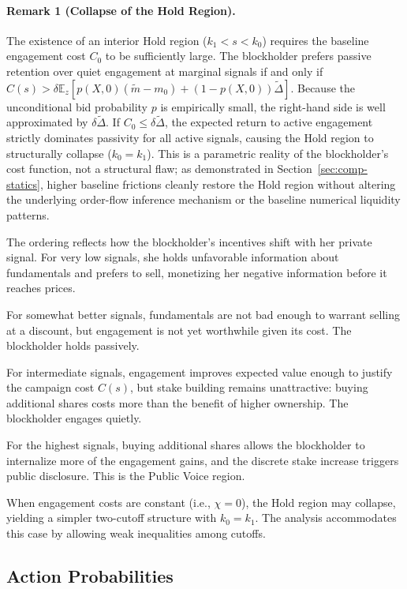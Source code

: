 \documentclass[11pt]{article}
\newcommand{\E}{\mathbb{E}}
\newcommand{\1}{\mathbf{1}}
\begin{document}
\paragraph{Remark 1 (Collapse of the Hold Region).}
The existence of an interior Hold region ($k_1 < s < k_0$) requires the baseline engagement cost $C_0$ to be sufficiently large. The blockholder prefers passive retention over quiet engagement at marginal signals if and only if $C(s) > \delta \E_z[p(X,0)(\tilde{m}-m_0) + (1-p(X,0))\tilde{\Delta}]$. Because the unconditional bid probability $p$ is empirically small, the right-hand side is well approximated by $\delta \tilde{\Delta}$. If $C_0 \le \delta \tilde{\Delta}$, the expected return to active engagement strictly dominates passivity for all active signals, causing the Hold region to structurally collapse ($k_0 = k_1$). This is a parametric reality of the blockholder's cost function, not a structural flaw; as demonstrated in Section~\ref{sec:comp-statics}, higher baseline frictions cleanly restore the Hold region without altering the underlying order-flow inference mechanism or the baseline numerical liquidity patterns.

The ordering reflects how the blockholder's incentives shift with her private signal. For very low signals, she holds unfavorable information about fundamentals and prefers to sell, monetizing her negative information before it reaches prices.

For somewhat better signals, fundamentals are not bad enough to warrant selling at a discount, but engagement is not yet worthwhile given its cost. The blockholder holds passively.

For intermediate signals, engagement improves expected value enough to justify the campaign cost $C(s)$, but stake building remains unattractive: buying additional shares costs more than the benefit of higher ownership. The blockholder engages quietly.

For the highest signals, buying additional shares allows the blockholder to internalize more of the engagement gains, and the discrete stake increase triggers public disclosure. This is the Public Voice region.

When engagement costs are constant (i.e., $\chi=0$), the Hold region may collapse, yielding a simpler two-cutoff structure with $k_0=k_1$. The analysis accommodates this case by allowing weak inequalities among cutoffs.

%
\subsection{Action Probabilities}
%
\end{document}
